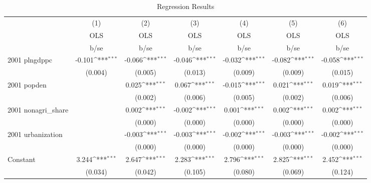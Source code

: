 \begin{table}[htbp]\centering
\def\sym#1{\ifmmode^{#1}\else\(^{#1}\)\fi}
\caption{Regression Results}
\begin{tabular}{l*{6}{c}}
\hline\hline
                    &\multicolumn{1}{c}{(1)}&\multicolumn{1}{c}{(2)}&\multicolumn{1}{c}{(3)}&\multicolumn{1}{c}{(4)}&\multicolumn{1}{c}{(5)}&\multicolumn{1}{c}{(6)}\\
                    &\multicolumn{1}{c}{OLS}&\multicolumn{1}{c}{OLS}&\multicolumn{1}{c}{OLS}&\multicolumn{1}{c}{OLS}&\multicolumn{1}{c}{OLS}&\multicolumn{1}{c}{OLS}\\
                    &        b/se         &        b/se         &        b/se         &        b/se         &        b/se         &        b/se         \\
\hline
2001 plngdppc       &      -0.101\sym{***}&      -0.066\sym{***}&      -0.046\sym{***}&      -0.032\sym{***}&      -0.082\sym{***}&      -0.058\sym{***}\\
                    &     (0.004)         &     (0.005)         &     (0.013)         &     (0.009)         &     (0.009)         &     (0.015)         \\
2001 popden         &                     &       0.025\sym{***}&       0.067\sym{***}&      -0.015\sym{***}&       0.021\sym{***}&       0.019\sym{***}\\
                    &                     &     (0.002)         &     (0.006)         &     (0.005)         &     (0.002)         &     (0.006)         \\
2001 nonagri\_share  &                     &       0.002\sym{***}&      -0.002\sym{***}&       0.001\sym{***}&       0.002\sym{***}&       0.002\sym{***}\\
                    &                     &     (0.000)         &     (0.000)         &     (0.000)         &     (0.000)         &     (0.000)         \\
2001 urbanization   &                     &      -0.003\sym{***}&      -0.003\sym{***}&      -0.002\sym{***}&      -0.003\sym{***}&      -0.002\sym{***}\\
                    &                     &     (0.000)         &     (0.000)         &     (0.000)         &     (0.000)         &     (0.000)         \\
Constant            &       3.244\sym{***}&       2.647\sym{***}&       2.283\sym{***}&       2.796\sym{***}&       2.825\sym{***}&       2.452\sym{***}\\
                    &     (0.034)         &     (0.042)         &     (0.105)         &     (0.080)         &     (0.069)         &     (0.124)         \\

\end{tabular}
\end{table}
